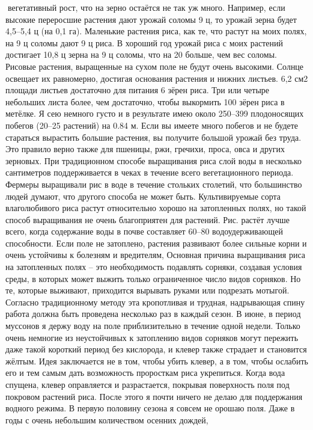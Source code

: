 \documentclass[a4paper]{book}
\begin{document}
вегетативный рост, что на зерно остаётся не так уж много. Например, если высокие
переросшие растения дают урожай соломы 9 ц, то урожай зерна будет 4,5–5,4 ц (на 0,1 га).
Маленькие растения риса, как те, что растут на моих полях, на 9 ц соломы дают 9 ц риса. В
хороший год урожай риса с моих растений достигает 10,8 ц зерна на 9 ц соломы, что на 20 %
больше, чем вес соломы.
Рисовые растения, выращенные на сухом поле не будут очень высокими. Солнце
освещает их равномерно, достигая основания растения и нижних листьев. 6,2 см2 площади
листьев достаточно для питания 6 зёрен риса. Три или четыре небольших листа более, чем
достаточно, чтобы выкормить 100 зёрен риса в метёлке. Я сею немного густо и в результате
имею около 250–399 плодоносящих побегов (20–25 растений) на 0.84 м. Если вы имеете
много побегов и не будете стараться вырастить большие растения, вы получите большой
урожай без труда. Это правило верно также для пшеницы, ржи, гречихи, проса, овса и других
зерновых.
При традиционном способе выращивания риса слой воды в несколько сантиметров
поддерживается в чеках в течение всего вегетационного периода. Фермеры выращивали рис в
воде в течение стольких столетий, что большинство людей думают, что другого способа не
может быть. Культивируемые сорта влаголюбивого риса растут относительно хорошо на
затопленных полях, но такой способ выращивания не очень благоприятен для растений. Рис.
растёт лучше всего, когда содержание воды в почве составляет 60–80 %
водоудерживающей способности. Если поле не затоплено, растения развивают более
сильные корни и очень устойчивы к болезням и вредителям,
Основная причина выращивания риса на затопленных полях – это необходимость
подавлять сорняки, создавая условия среды, в которых может выжить только ограниченное
число видов сорняков. Но те, которые выживают, приходится вырывать руками или подрезать
мотыгой. Согласно традиционному методу эта кропотливая и трудная, надрывающая спину
работа должна быть проведена несколько раз в каждый сезон.
В июне, в период муссонов я держу воду на поле приблизительно в течение одной
недели. Только очень немногие из неустойчивых к затоплению видов сорняков могут
пережить даже такой короткий период без кислорода, и клевер также страдает и становится
жёлтым. Идея заключается не в том, чтобы убить клевер, а в том, чтобы ослабить его и тем
самым дать возможность проросткам риса укрепиться. Когда вода спущена, клевер
оправляется и разрастается, покрывая поверхность поля под покровом растений риса. После
этого я почти ничего не делаю для поддержания водного режима. В первую половину сезона
я совсем не орошаю поля. Даже в годы с очень небольшим количеством осенних дождей,
\end{document}
